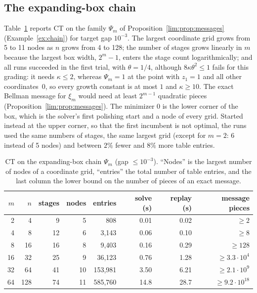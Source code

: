 \subsection{The expanding-box chain}\label{sec:comp-chain}
Table~\ref{tab:chain} reports CT on the family $\Psi_m$ of
Proposition~\ref{lim:prop:messages} (Example~\ref{ex:chain}) for target gap
$10^{-3}$. The largest coordinate grid grows from 5 to 11 nodes as $n$ grows
from 4 to 128; the number of stages grows linearly in $m$ because the largest
box width, $2^m-1$, enters the stage count logarithmically; and all runs
succeeded in the first trial, with
$\theta=1/4$, although $8\kappa\theta^2\le1$ fails for this grading: it needs
$\kappa\le2$, whereas $\Psi_m=1$ at the point with $z_1=1$ and all other
coordinates~$0$, so every growth constant is at most $1$ and $\kappa\ge10$.
The exact Bellman message for $\xi_m$ would need at least $2^{m-1}$ quadratic
pieces
(Proposition~\ref{lim:prop:messages}). The minimizer $0$ is the lower corner of
the box, which is the solver's first polishing start and a node of every
grid. Started instead at the upper corner, so that the first incumbent is not
optimal, the runs used the same numbers of stages, the same largest grid
(except for $m=2$: 6 instead of 5 nodes) and between $2\%$ fewer and $8\%$
more table entries.

\begin{table}[t]
\centering\small
\caption{CT on the expanding-box chain $\Psi_m$ (gap $\le10^{-3}$). ``Nodes'' is
the largest number of nodes of a coordinate grid, ``entries'' the total
number of table entries, and the last column the lower bound on the number of
pieces of an exact message.}\label{tab:chain}
\begin{tabular}{rrrrrrrr}
\toprule
$m$ & $n$ & stages & nodes & entries & solve (s) & replay (s) & message pieces\\
\midrule
2 & 4 & 9 & 5 & 808 & 0.01 & 0.02 & $\ge2$\\
4 & 8 & 12 & 6 & 3{,}143 & 0.06 & 0.10 & $\ge8$\\
8 & 16 & 16 & 8 & 9{,}403 & 0.16 & 0.29 & $\ge128$\\
16 & 32 & 25 & 9 & 36{,}123 & 0.76 & 1.28 & $\ge3.3\cdot10^4$\\
32 & 64 & 41 & 10 & 153{,}981 & 3.50 & 6.21 & $\ge2.1\cdot10^9$\\
64 & 128 & 74 & 11 & 585{,}760 & 14.8 & 28.7 & $\ge9.2\cdot10^{18}$\\
\bottomrule
\end{tabular}
\end{table}

